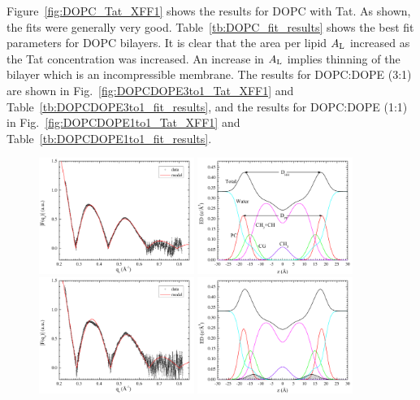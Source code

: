 Figure~\ref{fig:DOPC_Tat_XFF1} shows the results for DOPC with Tat. 
As shown, the fits were generally very good.  
Table~\ref{tb:DOPC_fit_results} shows the best fit parameters for DOPC bilayers.
It is clear that the area per lipid $A_\textrm{L}$ increased as the Tat concentration was
increased. An increase in $A_\textrm{L}$ implies thinning of the bilayer which is an 
incompressible membrane. The results for DOPC:DOPE (3:1) are shown in 
Fig.~\ref{fig:DOPCDOPE3to1_Tat_XFF1} and 
Table~\ref{tb:DOPCDOPE3to1_fit_results}, and the results for DOPC:DOPE (1:1) 
in Fig.~\ref{fig:DOPCDOPE1to1_Tat_XFF1} and 
Table~\ref{tb:DOPCDOPE1to1_fit_results}.
\begin{figure}[htbp]
  \centering
  \includegraphics[width=0.45\textwidth,valign=t]{figures/Tat/SDP_Results/XFF/DOPC_XFF1} 
  \includegraphics[width=0.45\textwidth,valign=t]{figures/Tat/SDP_Results/EDP/DOPC_EDP1} 
  \includegraphics[width=0.45\textwidth,valign=t]{figures/Tat/SDP_Results/XFF/DOPC_Tat_62to1_3p0_XFF1}
  \includegraphics[width=0.45\textwidth,valign=t]{figures/Tat/SDP_Results/EDP/DOPC_Tat_62to1_3p0_EDP1} 

\end{figure}
